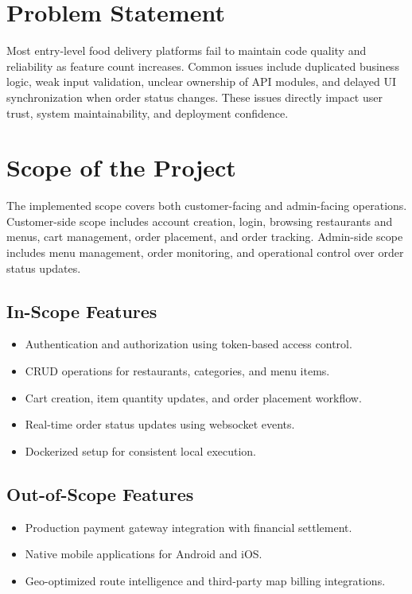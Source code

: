 \documentclass[12pt,a4paper]{report}
\begin{document}
\section{Problem Statement}
Most entry-level food delivery platforms fail to maintain code quality and reliability as feature count increases. Common issues include duplicated business logic, weak input validation, unclear ownership of API modules, and delayed UI synchronization when order status changes. These issues directly impact user trust, system maintainability, and deployment confidence.

\section{Scope of the Project}
The implemented scope covers both customer-facing and admin-facing operations. Customer-side scope includes account creation, login, browsing restaurants and menus, cart management, order placement, and order tracking. Admin-side scope includes menu management, order monitoring, and operational control over order status updates.

\subsection{In-Scope Features}
\begin{itemize}
    \item Authentication and authorization using token-based access control.
    \item CRUD operations for restaurants, categories, and menu items.
    \item Cart creation, item quantity updates, and order placement workflow.
    \item Real-time order status updates using websocket events.
    \item Dockerized setup for consistent local execution.
\end{itemize}

\subsection{Out-of-Scope Features}
\begin{itemize}
    \item Production payment gateway integration with financial settlement.
    \item Native mobile applications for Android and iOS.
    \item Geo-optimized route intelligence and third-party map billing integrations.
\end{itemize}
\end{document}
